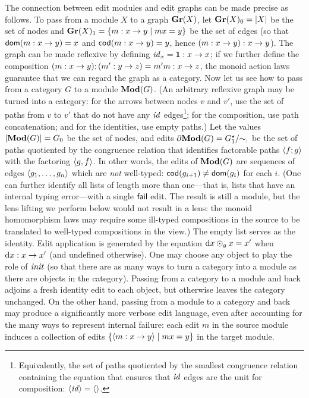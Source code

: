The connection between edit modules and edit graphs can be made precise as
follows. To pass from a module $X$ to a graph $\mathbf{Gr}(X)$, let $\mathbf{Gr}(X)_0=|X|$
be the set of nodes and $\mathbf{Gr}(X)_1=\{m : x \to y \mid mx=y\}$ be the set
of edges (so that $\mathsf{dom}(m : x \to y)=x$ and $\mathsf{cod}(m : x \to y)=y$,
hence $(m : x \to y) : x \to y$). The graph can be made reflexive by
defining $\mathit{id}_x = \mbox{\bf{1}} : x \to x$; if we further define the composition
$(m : x \to y);(m' : y \to z)=m'm : x \to z$, the monoid action
laws guarantee that we can regard the graph as a category. Now let us see
how to pass from a category $G$ to a module $\mathbf{Mod}(G)$. (An arbitrary
reflexive graph may be turned into a category: for the arrows between nodes
$v$ and $v'$, use the set of paths from $v$ to $v'$ that do not have any
$\mathit{id}$ edges\footnote{Equivalently, the set of paths quotiented by the
smallest congruence relation containing the equation that ensures that $\mathit{id}$
edges are the unit for composition: $\left< \mathit{id} \right> = \left<\right>$.}; for the
composition, use path concatenation; and for the identities, use empty
paths.) Let the values $|\mathbf{Mod}(G)|=G_0$ be the set of nodes, and edits $\partial
\mathbf{Mod}(G)=G_1^\star/{\sim}_;$ be the set of paths quotiented by the congruence
relation that identifies factorable paths $\left< f;g \right>$ with the
factoring $\left< g , f \right>$. In other words, the edits of $\mathbf{Mod}(G)$
are sequences of edges $\left< g_1 ,\ldots, g_n \right>$ which are \emph{not}
well-typed: $\mathsf{cod}(g_{i+1}) \ne \mathsf{dom}(g_i)$ for each $i$. (One can further
identify all lists of length more than one---that is, lists that have an
internal typing error---with a single $\mathsf{fail}$ edit. The result is still a
module, but the lens lifting we perform below would not result in a lens:
the monoid homomorphism laws may require some ill-typed compositions in the
source to be translated to well-typed compositions in the view.)
The empty list serves as the identity. Edit application is generated by the
equation $\textrm{d} x \odot_g x = x'$ when $\textrm{d} x : x \to x'$ (and undefined
otherwise). One may choose any object to play the role of $\mathit{init}$ (so that
there are as many ways to turn a category into a module as there are objects
in the category). Passing from a category to a module and back adjoins a
fresh identity edit to each object, but otherwise leaves the category
unchanged. On the other hand, passing from a module to a category and back
may produce a significantly more verbose edit language, even after
accounting for the many ways to represent internal failure: each edit $m$ in
the source module induces a collection of edits $\{\left< m : x \to
y\right> \mid mx = y\}$ in the target module.


